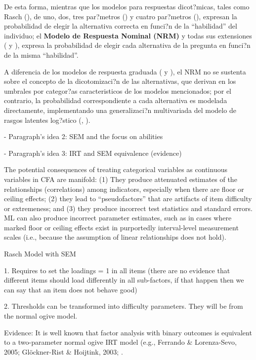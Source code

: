 De esta forma, mientras que los modelos para respuestas dicot?micas, tales como Rasch (\citealp{Rasch1980}), de uno, dos, tres par?metros (\citealp{Lord_Nov2008}) y cuatro par?metros (\citealp{McDonald1967}), expresan la probabilidad de elegir la alternativa correcta en funci?n de la ``habilidad'' del individuo; el \textbf{Modelo de Respuesta Nominal (NRM)} y todas sus extensiones (\citealt{Bock1972}  y \citealt[cap?tulo 2]{Linden1997}), expresa la probabilidad de elegir cada alternativa de la pregunta en funci?n de la misma ``habilidad''.

A diferencia de los modelos de respuesta graduada (\citealt{Samejima1969, Samejima1972} y \citealt[cap?tulo 5]{Ham_Swam1991}), el NRM no se sustenta sobre el concepto de la dicotomizaci?n de las alternativas, que derivan en los umbrales por categor?as caracteristicos de los modelos mencionados; por el contrario, la probabilidad correspondiente a cada alternativa es modelada directamente, implementando una generalizaci?n multivariada del modelo de rasgos latentes log?stico (\citealt{Bock1972}, \citealt{Ostini2006}).



- Paragraph's idea 2: SEM and the focus on abilities




- Paragraph's idea 3: IRT and SEM equivalence (evidence)

\citep{Brown_2015}
The potential consequences of treating categorical variables as continuous variables in CFA are manifold: (1) They produce attenuated estimates of the relationships (correlations) among indicators, especially when there are floor or ceiling effects; (2) they lead to “pseudofactors” that are artifacts of item difficulty or extremeness; and (3) they produce incorrect test statistics and standard errors. ML can also produce  incorrect parameter estimates, such as in cases where marked floor or ceiling effects exist in purportedly interval-level measurement scales (i.e., because the assumption of linear relationships does not hold).


Rasch Model with SEM

1. Requires to set the loadings = 1 in all items 
(there are no evidence that different items should load differently in all sub-factors, if that happen then we can say that an item does not behave good)

2. Thresholds can be transformed into difficulty parameters. They will be from the normal ogive model.


Evidence:
It is well known that factor analysis with binary outcomes is equivalent to a two-parameter normal ogive IRT model (e.g., Ferrando & Lorenza-Sevo, 2005; Glöckner-Rist & Hoijtink, 2003; \citep{Kamata_et_al_2008, Takane_et_al_1987}.


